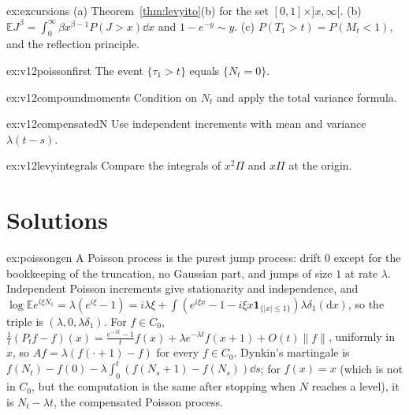 \begin{hint}{ex:excursions}
(a) Theorem~\ref{thm:levyito}(b) for the set $[0,1]\times]x,\infty[$. (b) $\mathbb EJ^\beta=\int_0^\infty\beta x^{\beta-1}P(J>x)\dd x$ and $1-e^{-y}\sim y$. (c) $P(T_1>t)=P(M_t<1)$, and the reflection principle.
\end{hint}

\begin{hint}{ex:v12poissonfirst}
The event $\{\tau_1>t\}$ equals $\{N_t=0\}$.
\end{hint}

\begin{hint}{ex:v12compoundmoments}
Condition on $N_t$ and apply the total variance formula.
\end{hint}

\begin{hint}{ex:v12compensatedN}
Use independent increments with mean and variance $\lambda(t-s)$.
\end{hint}

\begin{hint}{ex:v12levyintegrals}
Compare the integrals of $x^2\Pi$ and $x\Pi$ at the origin.
\end{hint}

\section{Solutions}

\begin{solution}{ex:poissongen}
\idea A Poisson process is the purest jump process: drift $0$ except for the bookkeeping of the truncation, no Gaussian part, and jumps of size $1$ at rate $\lambda$.
\writeup Independent Poisson increments give stationarity and independence, and $\log\mathbb Ee^{i\xi N_1}=\lambda(e^{i\xi}-1)=i\lambda\xi+\int(e^{i\xi x}-1-i\xi x\mathbf 1_{\{|x|\le1\}})\lambda\delta_1(\mathrm dx)$, so the triple is
$(\lambda,0,\lambda\delta_1)$. For $f\in C_0$, $\frac1t(P_tf-f)(x)=\frac{e^{-\lambda t}-1}tf(x)+\lambda e^{-\lambda t}f(x+1)+O(t)\|f\|$, uniformly in $x$, so $Af=\lambda(f(\cdot+1)-f)$ for every $f\in C_0$. Dynkin's martingale is
$f(N_t)-f(0)-\lambda\int_0^t(f(N_s+1)-f(N_s))\dd s$; for $f(x)=x$ (which is not in $C_0$, but the computation is the same after stopping when $N$ reaches a level), it is $N_t-\lambda t$, the compensated Poisson process.
\end{solution}

